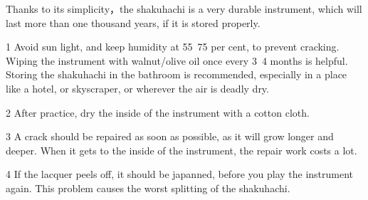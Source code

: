 ﻿Thanks to its simplicity，the shakuhachi is a very durable instrument, which will last more than one thousand years, if it is stored properly. 

\par

1  Avoid sun light, and keep humidity at 55~75 per cent, to prevent cracking.\\
   Wiping the instrument with walnut/olive oil once every 3~4 months is helpful.\\
   Storing the shakuhachi in the bathroom is recommended, especially in a place like a hotel, or skyscraper, or wherever the air is deadly dry. 

\par

2  After practice, dry the inside of the instrument with a cotton cloth.

\par

3  A crack should be repaired as soon as possible, as it will grow longer and deeper.
   When it gets to the inside of the instrument, the repair work costs a lot.

\par

4  If the lacquer peels off, it should be japanned, before you play the 
   instrument again. This problem causes the worst splitting of the shakuhachi.

\vfill*


	
